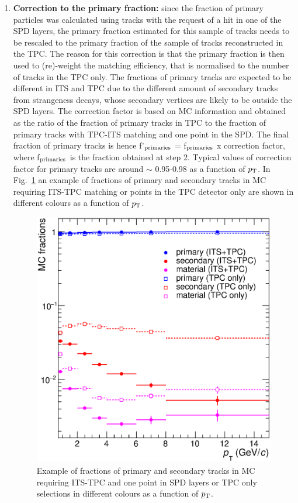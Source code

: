 \begin{enumerate}
\item {\bf Correction to the primary fraction:} since the fraction of primary
 particles was calculated using tracks with the request of a hit in one of the SPD layers, 
the primary fraction estimated for this sample of tracks 
needs to be rescaled to the primary fraction of the sample of tracks reconstructed in the TPC.
The reason for this correction is that the primary fraction is then used 
to (re)-weight the matching efficiency, that is normalised to the number of tracks in the TPC only. 
The fractions of primary tracks are expected to 
be different in ITS and TPC due to the different amount of 
secondary tracks from strangeness decays,
whose secondary vertices are likely to be outside the SPD layers. 
The correction factor is based on MC information and obtained as 
the ratio of the fraction of primary tracks in TPC to the fraction of primary
 tracks with TPC-ITS matching and one point in the SPD. The final fraction of primary tracks is hence
  f'$_{\rm primaries}$ = f$_{\rm primaries}$ x correction factor, 
  where f$_{\rm primaries}$ is the fraction obtained at step 2. 
  Typical values of correction factor for primary tracks are around $\sim$ 0.95-0.98
  as a function of $p_{\rm T}$. 
  In Fig.~\ref{fig:MCfractions} an example of fractions of primary 
  and secondary tracks in MC requiring ITS-TPC matching or points in the TPC detector only are 
  shown in different colours as a function of $p_{\rm T}$.
\begin{figure}[!htb]
\begin{center}
\includegraphics[width=.50\textwidth]{FigCap4/MCfractions_ESDTrOnly_VsPt_PiK.eps}
\caption{Example of fractions of primary and secondary tracks in MC requiring ITS-TPC and one point in SPD layers or TPC only selections in different colours as a function of $p_{\rm T}$.}
\label{fig:MCfractions}
\end{center}
\end{figure}


\end{enumerate}
